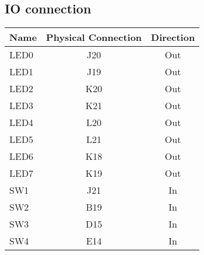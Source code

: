 \subsection{IO connection}
\begin{table}[h]
\centering
\begin{tabular}{|l|c|c|}
	\hline
	{\bf Name} & {\bf Physical Connection} & {\bf Direction}\\ \hline
	LED0 & J20 & Out \\ \hline
	LED1 & J19 & Out \\ \hline
	LED2 & K20 & Out \\ \hline
	LED3 & K21 & Out \\ \hline
	LED4 & L20 & Out \\ \hline
	LED5 & L21 & Out \\ \hline
	LED6 & K18 & Out \\ \hline
	LED7 & K19 & Out \\ \hline\hline
	SW1  & J21 & In	 \\ \hline
	SW2  & B19 & In	 \\ \hline
	SW3  & D15 & In	 \\ \hline
	SW4  & E14 & In	 \\ \hline
\end{tabular}
\end{table}

\clearpage

